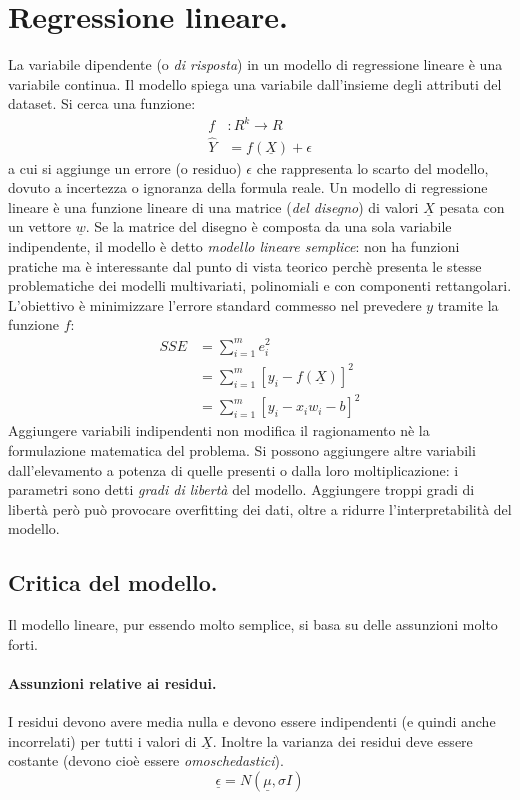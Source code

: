 \documentclass[11pt, a4page, twocolumn]{article}
\begin{document}
\section{Regressione lineare.}
La variabile dipendente (o \textit{di risposta}) in un modello di regressione lineare è una variabile continua.
Il modello spiega una variabile dall'insieme degli attributi del dataset.
Si cerca una funzione: 
\begin{align*}
  f &: R^k \rightarrow R \\
  \widehat{Y} &= f(\underline{X}) + \epsilon
\end{align*}
a cui si aggiunge un errore (o residuo) $\epsilon$ che rappresenta lo scarto del modello, dovuto a incertezza o ignoranza della formula reale. \newline
Un modello di regressione lineare è una funzione lineare di una matrice (\textit{del disegno}) di valori $\underline{X}$ pesata con un vettore $\underline{w}$.
Se la matrice del disegno è composta da una sola variabile indipendente, il modello è detto \textit{modello lineare semplice}: non ha funzioni pratiche ma è interessante dal punto di vista teorico perchè presenta le stesse problematiche dei modelli multivariati, polinomiali e con componenti rettangolari. \newline
L'obiettivo è minimizzare l'errore standard commesso nel prevedere $y$ tramite la funzione $f$:
\begin{align*}
  SSE &= \sum^m_{i=1}{e^2_i} \\
      &= \sum^m_{i=1}{[y_i - f(\underline{X})]^2} \\
      &= \sum^m_{i=1}{[y_i - x_i w_i - b]^2}
\end{align*}
Aggiungere variabili indipendenti non modifica il ragionamento nè la formulazione matematica del problema.
Si possono aggiungere altre variabili dall'elevamento a potenza di quelle presenti o dalla loro moltiplicazione: i parametri sono detti \textit{gradi di libertà} del modello.
Aggiungere troppi gradi di libertà però può provocare overfitting dei dati, oltre a ridurre l'interpretabilità del modello.

\subsection{Critica del modello.}
Il modello lineare, pur essendo molto semplice, si basa su delle assunzioni molto forti.

\paragraph{Assunzioni relative ai residui.}
I residui devono avere media nulla e devono essere indipendenti (e quindi anche incorrelati) per tutti i valori di $\underline{X}$.
Inoltre la varianza dei residui deve essere costante (devono cioè essere \textit{omoschedastici}).
\begin{equation*}
  \underline{\epsilon} = N(\underline{\mu}, \sigma{}I)
\end{equation*}
\end{document}
